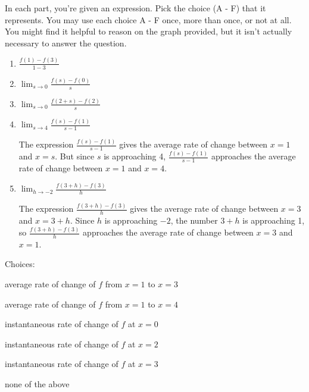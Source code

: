 \documentclass{article}
\theoremstyle{theorem}
\begin{document}
\begin{enumerate}
\begin{enumerate}
    In each part, you're given an expression. Pick the choice (A - F) that it represents. You may use each choice A - F once, more than once, or not at all. You might find it helpful to reason on the graph provided, but it isn't actually necessary to answer the question.

    \begin{enumerate}
    \item {} $\displaystyle \frac{f(1) - f(3)}{1-3}$
    \item {} $\displaystyle \lim_{s\to 0}\frac{ f(s) - f(0)}{s}$
    \item {} $\displaystyle \lim_{s\to 0}\frac{f (2+s) - f(2)}{s}$
    \item {} $\displaystyle \lim_{s\to 4}\frac{f(s) - f(1)}{s - 1}$

      \begin{solution}
        The expression $\displaystyle \frac{f(s) - f(1)}{s - 1}$ gives the average rate of change between $x = 1$ and $x = s$. But since $s$ is approaching 4, $\displaystyle \frac{f(s) - f(1)}{s - 1}$ approaches the average rate of change between $x = 1$ and $x = 4$. 
      \end{solution}

    \item {} $\displaystyle \lim_{h \to -2} \frac{f(3 + h) - f(3)}{h}$

      \begin{solution}
        The expression $\displaystyle \frac{f(3 + h) - f(3)}{h}$ gives the average rate of change between $x = 3$ and $x = 3 + h$. Since $h$ is approaching $-2$, the number $3 + h$ is approaching 1, so $\displaystyle \frac{f(3 + h) - f(3)}{h}$ approaches the average rate of change between $x = 3$ and $x = 1$. 
      \end{solution}
    \end{enumerate} 

    Choices:
    \begin{altenumerate}[label=\Alph*.]
    \item average rate of change of $f$ from $x=1$ to $x=3$
    \item average rate of change of $f$ from $x=1$ to $x=4$
    \item instantaneous rate of change of $f$ at $x=0$
    \item instantaneous rate of change of $f$ at $x=2$
    \item instantaneous rate of change of $f$ at $x=3$
    \item none of the above
    \end{altenumerate}


\end{enumerate}
\end{enumerate}
\end{document}
